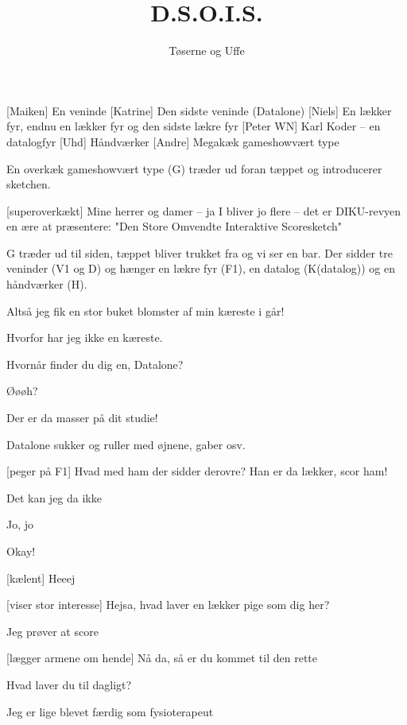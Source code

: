 \documentclass[danish]{article}
\title{D.S.O.I.S.}
\author{Tøserne og Uffe}
\begin{document}
\maketitle

\begin{roles}
  [Maiken] En veninde
  [Katrine] Den sidste veninde (Datalone)
  [Niels] En lækker fyr, endnu en lækker fyr og den sidste lækre fyr
  [Peter WN] Karl Koder -- en datalogfyr
  [Uhd] Håndværker
  [Andre] Megakæk gameshowvært type
\end{roles}

\begin{sketch}

\scene En overkæk gameshowvært type (G) træder ud foran tæppet og
introducerer sketchen.

[superoverkækt] Mine herrer og damer -- ja I bliver jo flere -- det
er DIKU-revyen en ære at præsentere: "Den Store Omvendte Interaktive
Scoresketch"

\scene G træder ud til siden, tæppet bliver trukket fra og vi ser en bar.
Der sidder tre veninder (V1 og D) og hænger en lækre fyr (F1), en datalog (K(datalog)) og en håndværker (H).

 Altså jeg fik en stor buket blomster af min kæreste i går!

 Hvorfor har jeg ikke en kæreste.

 Hvornår finder du dig en, Datalone?

 Øøøh?

 Der er da masser på dit studie!

\scene Datalone sukker og ruller med øjnene, gaber osv.

[peger på F1] Hvad med ham der sidder derovre? Han er da lækker, scor ham!

 Det kan jeg da ikke

 Jo, jo

 Okay! 

[kælent] Heeej

[viser stor interesse] Hejsa, hvad laver en lækker pige som dig
her?

 Jeg prøver at score

[lægger armene om hende] Nå da, så er du kommet til den rette

 Hvad laver du til dagligt? 

 Jeg er lige blevet færdig som fysioterapeut


\end{sketch}
\end{document}
